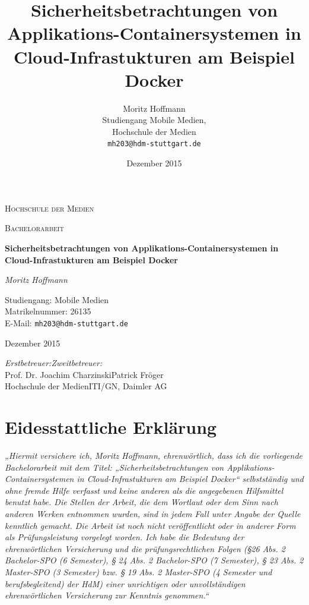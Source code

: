 \documentclass[11pt,a4paper,oneside]{report}
\newcommand{\thema}{Sicherheitsbetrachtungen von Applikations-Containersystemen in Cloud-Infrastukturen am Beispiel Docker}
\newcommand*{\signatureAndDate}{
    \par\noindent\makebox[2.5in]{\hrulefill} \hfill\makebox[2.0in]{\hrulefill}%
    \par\noindent\makebox[2.5in][l]{Unterschrift}      \hfill\makebox[2.0in][l]{Datum}%
}
\begin{document}
\begin{titlepage}
	\centering
	{\scshape\LARGE
		Hochschule der Medien
	\par}
	\vspace{1cm}
	{\scshape\Large
		Bachelorarbeit
	\par}
	\vspace{1.5cm}
	{\huge\bfseries
		\thema
	\par}
	\vspace{2cm}
	{\Large\itshape
		Moritz Hoffmann
	\par}
	\vspace{0.5cm}
	{\Large
		Studiengang: Mobile Medien\\
		Matrikelnummer: 26135\\
		E-Mail: \texttt{mh203@hdm-stuttgart.de}
	\par}
	\vspace{1.5cm}
	{\Large Dezember 2015\par}
	\vfill
	{\Large
		\emph{Erstbetreuer:}\hfill\emph{Zweitbetreuer:}\\
		Prof. Dr. Joachim Charzinski\hfill Patrick Fröger\\
		Hochschule der Medien\hfill ITI/GN, Daimler AG
	\par}

\end{titlepage}


\title{\thema}
\author{Moritz Hoffmann\\
  Studiengang Mobile Medien,\\
  Hochschule der Medien\\
  \texttt{mh203@hdm-stuttgart.de}}
\date{Dezember 2015}
\maketitle

\chapter*{Eidesstattliche Erklärung}
\emph{„Hiermit versichere ich, Moritz Hoffmann, ehrenwörtlich, dass ich die vorliegende Bachelorarbeit mit dem Titel: „\thema“ selbstständig und ohne fremde Hilfe verfasst und keine anderen als die angegebenen Hilfsmittel benutzt habe. Die Stellen der Arbeit, die dem Wortlaut oder dem Sinn nach anderen Werken entnommen wurden, sind in jedem Fall unter Angabe der Quelle kenntlich gemacht. Die Arbeit ist noch nicht veröffentlicht oder in anderer Form als Prüfungsleistung vorgelegt worden. Ich habe die Bedeutung der ehrenwörtlichen Versicherung und die prüfungsrechtlichen Folgen (§26 Abs. 2 Bachelor-SPO (6 Semester), § 24 Abs. 2 Bachelor-SPO (7 Semester), § 23 Abs. 2 Master-SPO (3 Semester) bzw. § 19 Abs. 2 Master-SPO (4 Semester und berufsbegleitend) der HdM) einer unrichtigen oder unvollständigen ehrenwörtlichen Versicherung zur Kenntnis genommen.“
}
\vspace{1.5cm}
\signatureAndDate
\newpage
\end{document}
